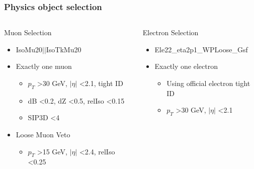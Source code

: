 \documentclass{beamer}
\begin{document}
\begin{frame}
\frametitle{Physics object selection}
\begin{columns}
\begin{block}{Muon Selection}
\begin{adjustwidth}{-0.5em}{-0.5em}
\tiny
\begin{itemize}
\vspace{.1cm}
\item IsoMu20$||$IsoTkMu20 %
\item Exactly one muon
\begin{itemize}
\tiny
\item $ p_{T}$ \textgreater 30 GeV, $|\eta|$ \textless 2.1, tight ID
\item dB \textless 0.2, dZ \textless 0.5, relIso \textless 0.15
\item SIP3D \textless 4
\end{itemize}
\item Loose Muon Veto
\begin{itemize}
\tiny
\item $ p_{T}$ \textgreater 15 GeV, $|\eta|$ \textless 2.4, relIso \textless 0.25
\end{itemize}
\end{itemize}
\vspace{.2cm}
\end{adjustwidth}
\end{block}
\begin{block}{Electron Selection}
\begin{adjustwidth}{-0.5em}{-0.5em}
  \tiny
  \begin{itemize}
  \vspace{.1cm}
\item Ele22\_eta2p1\_WPLoose\_Gsf %
\item Exactly one electron
\begin{itemize}
\tiny
\item Using official electron tight ID
\item $ p_{T}$ \textgreater 30 GeV, $|\eta|$ \textless 2.1

\end{itemize}
\end{itemize}
\end{adjustwidth}
\end{block}
\end{columns}
\end{frame}
\end{document}
